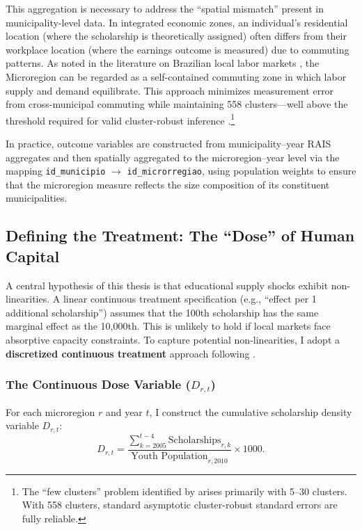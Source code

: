 This aggregation is necessary to address the ``spatial mismatch'' present in municipality-level data. In integrated economic zones, an individual's residential location (where the scholarship is theoretically assigned) often differs from their workplace location (where the earnings outcome is measured) due to commuting patterns. As noted in the literature on Brazilian local labor markets \cite{DixCarneiro2018}, the Microregion can be regarded as a self-contained commuting zone in which labor supply and demand equilibrate. This approach minimizes measurement error from cross-municipal commuting while maintaining 558 clusters---well above the threshold required for valid cluster-robust inference \cite{CameronMiller2015}.\footnote{The ``few clusters'' problem identified by  arises primarily with 5--30 clusters. With 558 clusters, standard asymptotic cluster-robust standard errors are fully reliable.}

In practice, outcome variables are constructed from municipality--year RAIS aggregates and then spatially aggregated to the microregion--year level via the mapping \texttt{id\_municipio} $\rightarrow$ \texttt{id\_microrregiao}, using population weights to ensure that the microregion measure reflects the size composition of its constituent municipalities.


\subsection{Defining the Treatment: The ``Dose'' of Human Capital}
\label{sec:treatment_def}

A central hypothesis of this thesis is that educational supply shocks exhibit non-linearities. A linear continuous treatment specification (e.g., ``effect per 1 additional scholarship'') assumes that the 100th scholarship has the same marginal effect as the 10,000th. This is unlikely to hold if local markets face absorptive capacity constraints. To capture potential non-linearities, I adopt a \textbf{discretized continuous treatment} approach following .

\subsubsection{The Continuous Dose Variable ($D_{r,t}$)}
For each microregion $r$ and year $t$, I construct the cumulative scholarship density variable $D_{r,t}$:
\begin{equation}
    D_{r,t} = \frac{\sum_{k=2005}^{t-4} \text{Scholarships}_{r,k}}{\text{Youth Population}_{r, 2010}} \times 1000.
    \label{eq:dose_variable}
\end{equation}

